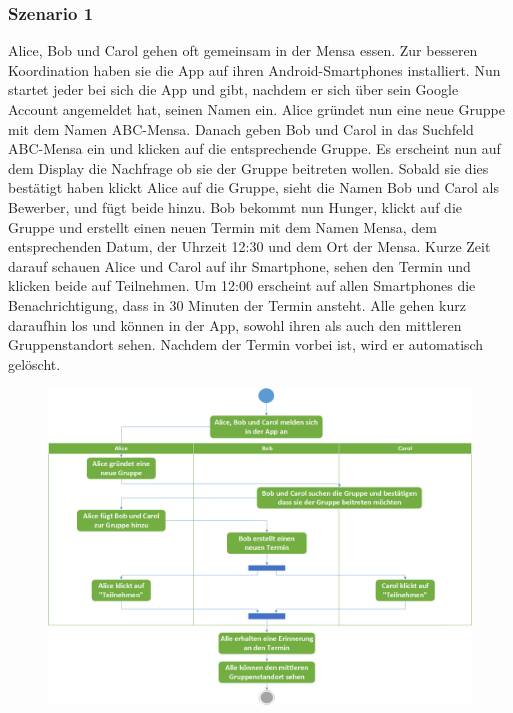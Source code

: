 \documentclass{scrartcl}
\begin{document}
	\subsubsection{Szenario 1}
	Alice, Bob und Carol gehen oft gemeinsam in der Mensa essen. Zur besseren Koordination haben sie die App auf ihren Android-Smartphones installiert.
	Nun startet jeder bei sich die App und gibt, nachdem er sich über sein Google Account angemeldet hat, seinen Namen ein.
	Alice gründet nun eine neue Gruppe mit dem Namen ABC-Mensa. Danach geben Bob und Carol in das Suchfeld ABC-Mensa ein und klicken auf die entsprechende Gruppe.
	Es erscheint nun auf dem Display die Nachfrage ob sie der Gruppe beitreten wollen. Sobald sie dies bestätigt haben klickt Alice auf die Gruppe,
	sieht die Namen Bob und Carol als Bewerber, und fügt beide hinzu.
	Bob bekommt nun Hunger, klickt auf die Gruppe und erstellt einen neuen Termin mit dem Namen Mensa, dem entsprechenden Datum, der Uhrzeit 12:30 und dem Ort der Mensa.
	Kurze Zeit darauf schauen Alice und Carol auf ihr Smartphone, sehen den Termin und klicken beide auf \glqq{}Teilnehmen\grqq{}.
	Um 12:00 erscheint auf allen Smartphones die Benachrichtigung, dass in 30 Minuten der Termin ansteht.
	Alle gehen kurz daraufhin los und können in der App, sowohl ihren als auch den mittleren Gruppenstandort sehen.
	Nachdem der Termin vorbei ist, wird er automatisch gelöscht.
	\newline
	\newline
	\begin{figure}[h]
	\centering
	\includegraphics[width=\textwidth]{Szenario1}
	\end{figure}
	
\end{document}
